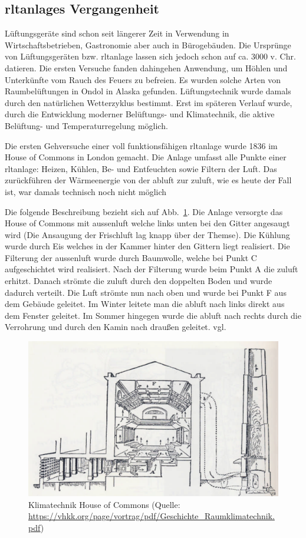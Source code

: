 \subsection{\Acp{rltanlage} Vergangenheit}
Lüftungsgeräte sind schon seit längerer Zeit in Verwendung \zB in Wirtschaftsbetrieben, Gastronomie aber auch in Bürogebäuden. Die Ursprünge von Lüftungsgeräten bzw. \ac{rltanlage} lassen sich jedoch schon auf ca. 3000 v. Chr. datieren.
Die ersten Versuche fanden dahingehen Anwendung, um Höhlen und Unterkünfte vom Rauch des Feuers zu befreien. Es wurden solche Arten von Raumbelüftungen \zB in Ondol in Alaska gefunden.
Lüftungstechnik wurde damals durch den natürlichen Wetterzyklus bestimmt. 
Erst im späteren Verlauf wurde, durch die Entwicklung moderner Belüftungs- und Klimatechnik, die aktive Belüftung- und Temperaturregelung möglich.

Die ersten Gehversuche einer voll funktionsfähigen \acs{rltanlage} wurde 1836 im House of Commons in London gemacht. Die Anlage umfasst alle Punkte einer \acs{rltanlage}: Heizen, Kühlen, Be- und Entfeuchten sowie Filtern der Luft. Das zurückführen der Wärmeenergie von der \gls{abluft} zur \gls{zuluft}, wie es heute der Fall ist, war damals technisch noch nicht möglich

Die folgende Beschreibung bezieht sich auf
Abb.~\ref{fig:House_of_Commons_Klimatechnik}.
Die Anlage versorgte das House of Commons mit \gls{aussenluft} welche links unten bei den Gitter angesaugt wird (Die Ansaugung der Frischluft lag knapp über der Themse). Die Kühlung wurde durch Eis welches in der Kammer hinter den Gittern liegt realisiert.
Die Filterung der \gls{aussenluft} wurde durch Baumwolle, welche bei Punkt C aufgeschichtet wird realisiert.
Nach der Filterung wurde beim Punkt A die \gls{zuluft} erhitzt. 
Danach strömte die \gls{zuluft} durch den doppelten Boden und wurde dadurch verteilt. Die Luft strömte nun nach oben und wurde bei Punkt F aus dem Gebäude geleitet. Im Winter leitete man die \gls{abluft} nach links direkt aus dem Fenster geleitet. Im Sommer hingegen wurde die \gls{abluft} nach rechts durch die Verrohrung und durch den Kamin  nach draußen geleitet. vgl.
\cite[vgl.][]{Fitzner_Finke:2010} 

\begin{figure}[ht]
	\centering
	\includegraphics[width=0.8\linewidth]{Bilder/Belueftung_House_of_Commons}
	\caption{Klimatechnik House of Commons  (Quelle: \url{https://vhkk.org/page/vortrag/pdf/Geschichte_Raumklimatechnik.pdf})}
	\label{fig:House_of_Commons_Klimatechnik}
\end{figure}



